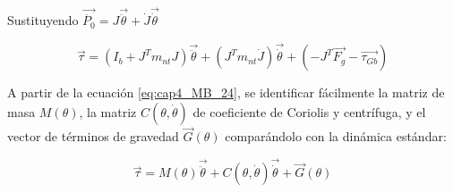         Sustituyendo  $ \overrightarrow{\ddot{P_{0}}}=J\overrightarrow{\ddot{ \theta }}+\dot{J} \overrightarrow{\dot{ \theta }} $
        
        \begin{equation}
              \overrightarrow{ \tau}= \left( I_{b}+J^{T} m_{nt} J \right)  \overrightarrow{\ddot{ \theta }}+ \left( J^{T} m_{nt}\dot{J} \right) \overrightarrow{\dot{ \theta }}+ \left( - J^{T}\overrightarrow{F_{g}}-\overrightarrow{ \tau_{Gb}} \right)  
              \label{eq:cap4_MB_24}
        \end{equation}
        
        
        A partir de la ecuación \ref{eq:cap4_MB_24}, se identificar fácilmente la matriz de masa  $ M \left(  \theta  \right)$, la matriz  $ C \left(  \theta ,\dot{ \theta } \right)  $  de coeficiente de Coriolis y centrífuga, y el vector de términos de gravedad  $ \overrightarrow{G} \left(  \theta  \right)  $  comparándolo con la dinámica estándar:
        
        \begin{equation}
              \overrightarrow{ \tau}=M \left(  \theta  \right) \overrightarrow{\ddot{ \theta }}+C \left(  \theta ,\dot{ \theta } \right) \overrightarrow{\dot{ \theta }}+ \overrightarrow{G} \left(  \theta  \right) 
                \label{eq:cap4_MB_25}
        \end{equation}
        
